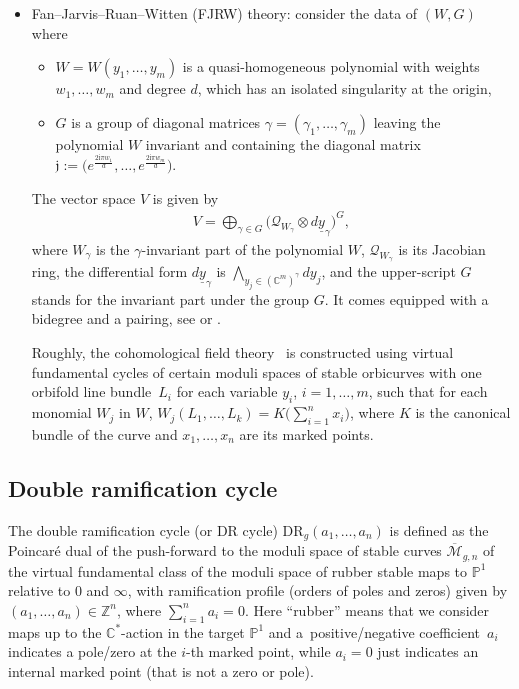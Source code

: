 \documentclass[pdftex]{sigma}
\numberwithin{equation}{section}
\newcommand{\mbP}{\mathbb P}
\newcommand{\mbC}{\mathbb C}
\newcommand{\oM}{\overline{\mathcal M}}
\newcommand{\<}{\left<}
\renewcommand{\>}{\right>}
\newcommand{\DR}{\mathrm{DR}}
\newcommand{\grj}{\mathfrak{j}}
\newcommand{\ci}{\mathrm{i}}
\newcommand{\cQ}{\mathcal{Q}}
\begin{document}
\begin{itemize}
\item Fan--Jarvis--Ruan--Witten (FJRW) theory: consider the data of $(W,G)$ where
\begin{itemize}\itemsep=0pt
\item $W=W(y_1,\dots,y_m)$ is a quasi-homogeneous polynomial with weights $w_1,\dotsc,w_m$ and degree $d$, which has an isolated singularity at the origin,
\item $G$ is a group of diagonal matrices $\gamma=(\gamma_1,\dotsc,\gamma_m)$ leaving the polynomial $W$ invariant and containing the diagonal matrix $\grj:=\big(e^{\frac{2 \ci \pi w_1}{d}},\dotsc,e^{\frac{2 \ci \pi w_m}{d}}\big)$.
\end{itemize}
The vector space $V$ is given by
\begin{gather*}V = \bigoplus_{\gamma \in G} \big(\cQ_{W_\gamma} \otimes d\underline{y}_\gamma\big)^G,\end{gather*}
where $W_\gamma$ is the $\gamma$-invariant part of the polynomial $W$, $\cQ_{W_\gamma}$ is its Jacobian ring, the dif\/ferential form $d\underline{y}_\gamma$ is $\bigwedge_{y_j \in (\mathbb{C}^m)^\gamma} dy_j$, and the upper-script $G$ stands for the invariant part under the group $G$. It comes equipped with a bidegree and a pairing, see \cite[equation~(4)]{LG/CY} or \cite[equation~(5.12)]{Polish1}.

Roughly, the cohomological f\/ield theory~\cite{FJRW2, FJRW} is constructed using virtual fundamental cycles of certain moduli spaces of stable orbicurves with one orbifold line bundle~$L_i$ for each variable $y_i$, $i=1,\dots,m$, such that for each monomial $W_j$ in $W$, $W_j(L_1,\dots,L_k) = K\big(\sum\limits_{i=1}^n x_i\big)$, where $K$ is the canonical bundle of the curve and $x_1,\dots,x_n$ are its marked points.
\end{itemize}

\subsection{Double ramif\/ication cycle} The double ramif\/ication cycle (or DR cycle) $\DR_g(a_1,\dots,a_n)$ is def\/ined as the Poincar\'e dual of the push-forward to the moduli space of stable curves $\oM_{g,n}$ of the virtual fundamental class of the moduli space of rubber stable maps to $\mathbb{P}^1$ relative to $0$ and $\infty$, with ramif\/ication prof\/ile (orders of poles and zeros) given by $(a_1,\dots,a_n)\in \mathbb{Z}^n$, where $\sum\limits_{i=1}^n a_i= 0$. Here ``rubber'' means that we consider maps up to the $\mbC^*$-action in the target $\mbP^1$ and a~positive/negative coef\/f\/i\-cient~$a_i$ indicates a pole/zero at the $i$-th marked point, while $a_i=0$ just indicates an internal marked point (that is not a zero or pole).
\end{document}
